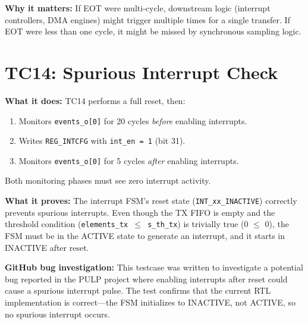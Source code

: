 \textbf{Why it matters:} If EOT were multi-cycle, downstream logic (interrupt controllers, DMA
engines) might trigger multiple times for a single transfer. If EOT were less than one cycle,
it might be missed by synchronous sampling logic.

\section{TC14: Spurious Interrupt Check}
\label{sec:tc14}

\textbf{What it does:} TC14 performs a full reset, then:
\begin{enumerate}[leftmargin=2em]
  \item Monitors \texttt{events\_o[0]} for 20 cycles \emph{before} enabling interrupts.
  \item Writes \texttt{REG\_INTCFG} with \texttt{int\_en = 1} (bit 31).
  \item Monitors \texttt{events\_o[0]} for 5 cycles \emph{after} enabling interrupts.
\end{enumerate}

Both monitoring phases must see zero interrupt activity.

\textbf{What it proves:} The interrupt FSM's reset state (\texttt{INT\_xx\_INACTIVE}) correctly
prevents spurious interrupts. Even though the TX FIFO is empty and the threshold condition
(\texttt{elements\_tx $\leq$ s\_th\_tx}) is trivially true (0 $\leq$ 0), the FSM must be in
the ACTIVE state to generate an interrupt, and it starts in INACTIVE after reset.

\textbf{GitHub bug investigation:} This testcase was written to investigate a potential bug
reported in the PULP project where enabling interrupts after reset could cause a spurious
interrupt pulse. The test confirms that the current RTL implementation is correct---the FSM
initializes to INACTIVE, not ACTIVE, so no spurious interrupt occurs.
